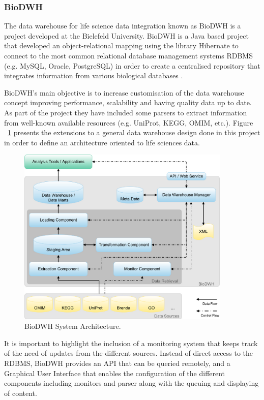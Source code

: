 \subsubsection{BioDWH}
The data warehouse for life science data integration known as BioDWH is a project developed at the Bielefeld University. BioDWH is a Java based project that developed an object-relational mapping using the library Hibernate to connect to the most common relational database management systems RDBMS (e.g. MySQL, Oracle, PostgreSQL) in order to create a centralised repository that integrates information from various biological databases \cite{TOP2008}.

BioDWH's main objective is to increase customisation of the data warehouse concept improving performance, scalability and having quality data up to date. As part of the project they have included some parsers to extract information from well-known available resources (e.g. UniProt, KEGG, OMIM, etc.). Figure ~\ref{fig:biodwh} presents the extensions to a general data warehouse design done in this project in order to define an architecture oriented to life sciences data.

\begin{figure}  
\centering
\includegraphics[width=4in]{figures/dwh_architecture.png}
\caption[BioDWH System Architecture.]{BioDWH System Architecture.
\label{fig:biodwh}}
\end{figure}

It is important to highlight the inclusion of a monitoring system that keeps track of the need of updates from the different sources. Instead of direct access to the RDBMS, BioDWH provides an API that can be queried remotely, and a Graphical User Interface that enables the configuration of the different components including monitors and parser along with the queuing and displaying of content.

